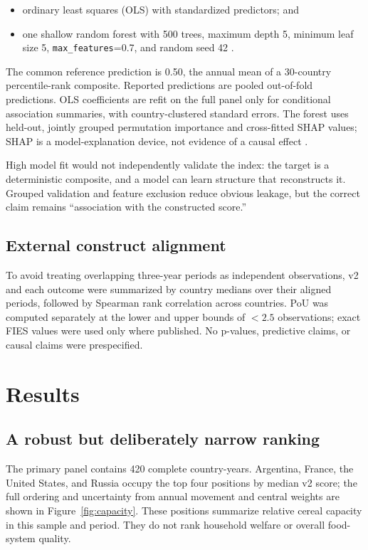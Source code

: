 \documentclass[11pt]{article}
\begin{document}
\begin{itemize}
  \item ordinary least squares (OLS) with standardized predictors; and
  \item one shallow random forest with 500 trees, maximum depth 5, minimum leaf size 5, \texttt{max\_features}=0.7, and random seed 42 \cite{breiman2001}.
\end{itemize}

The common reference prediction is 0.50, the annual mean of a 30-country percentile-rank composite. Reported predictions are pooled out-of-fold predictions. OLS coefficients are refit on the full panel only for conditional association summaries, with country-clustered standard errors. The forest uses held-out, jointly grouped permutation importance and cross-fitted SHAP values; SHAP is a model-explanation device, not evidence of a causal effect \cite{lundberglee2017}.

High model fit would not independently validate the index: the target is a deterministic composite, and a model can learn structure that reconstructs it. Grouped validation and feature exclusion reduce obvious leakage, but the correct claim remains ``association with the constructed score.''

\subsection{External construct alignment}

To avoid treating overlapping three-year periods as independent observations, v2 and each outcome were summarized by country medians over their aligned periods, followed by Spearman rank correlation across countries. PoU was computed separately at the lower and upper bounds of $<2.5$ observations; exact FIES values were used only where published. No p-values, predictive claims, or causal claims were prespecified.

\section{Results}

\subsection{A robust but deliberately narrow ranking}

The primary panel contains 420 complete country-years. Argentina, France, the United States, and Russia occupy the top four positions by median v2 score; the full ordering and uncertainty from annual movement and central weights are shown in Figure~\ref{fig:capacity}. These positions summarize relative cereal capacity in this sample and period. They do not rank household welfare or overall food-system quality.
\end{document}

